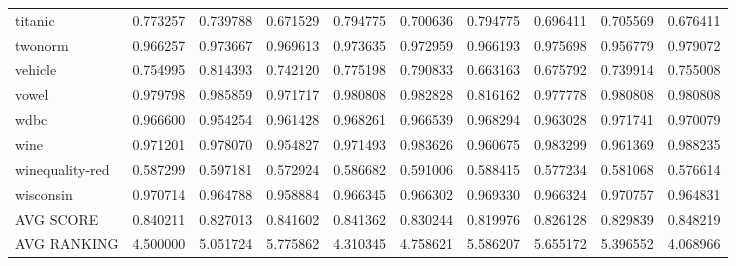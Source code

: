 \begin{tabular}{lrrrrrrrrr}
titanic         &             0.773257 &             0.739788 &            0.671529 &              0.794775 &              0.700636 &             0.794775 &      0.696411 &      0.705569 &     0.676411 \\
twonorm         &             0.966257 &             0.973667 &            0.969613 &              0.973635 &              0.972959 &             0.966193 &      0.975698 &      0.956779 &     0.979072 \\
vehicle         &             0.754995 &             0.814393 &            0.742120 &              0.775198 &              0.790833 &             0.663163 &      0.675792 &      0.739914 &     0.755008 \\
vowel           &             0.979798 &             0.985859 &            0.971717 &              0.980808 &              0.982828 &             0.816162 &      0.977778 &      0.980808 &     0.980808 \\
wdbc            &             0.966600 &             0.954254 &            0.961428 &              0.968261 &              0.966539 &             0.968294 &      0.963028 &      0.971741 &     0.970079 \\
wine            &             0.971201 &             0.978070 &            0.954827 &              0.971493 &              0.983626 &             0.960675 &      0.983299 &      0.961369 &     0.988235 \\
winequality-red &             0.587299 &             0.597181 &            0.572924 &              0.586682 &              0.591006 &             0.588415 &      0.577234 &      0.581068 &     0.576614 \\
wisconsin       &             0.970714 &             0.964788 &            0.958884 &              0.966345 &              0.966302 &             0.969330 &      0.966324 &      0.970757 &     0.964831 \\
AVG SCORE       &             0.840211 &             0.827013 &            0.841602 &              0.841362 &              0.830244 &             0.819976 &      0.826128 &      0.829839 &     0.848219 \\
AVG RANKING     &             4.500000 &             5.051724 &            5.775862 &              4.310345 &              4.758621 &             5.586207 &      5.655172 &      5.396552 &     4.068966 \\
\bottomrule
\end{tabular}
